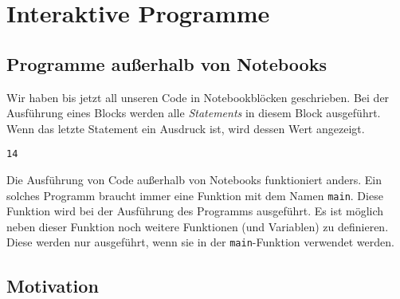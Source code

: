 \label{7531f3b9a5fdae5a}
\section{Interaktive Programme}\label{interaktive-programme}

\subsection{Programme außerhalb von
Notebooks}\label{programme-auuxdferhalb-von-notebooks}

Wir haben bis jetzt all unseren Code in Notebookblöcken geschrieben. Bei
der Ausführung eines Blocks werden alle \emph{Statements} in diesem
Block ausgeführt. Wenn das letzte Statement ein Ausdruck ist, wird
dessen Wert angezeigt.

\label{b9457421e12f0f57}
\begin{Shaded}
\begin{Highlighting}[]
 \OperatorTok{+} 
 \OperatorTok{*} 
\end{Highlighting}
\end{Shaded}

\begin{verbatim}
14
\end{verbatim}

\label{89dbf98ac5d54ed9}
Die Ausführung von Code außerhalb von Notebooks funktioniert anders. Ein
solches Programm braucht immer eine Funktion mit dem Namen
\texttt{main}. Diese Funktion wird bei der Ausführung des Programms
ausgeführt. Es ist möglich neben dieser Funktion noch weitere Funktionen
(und Variablen) zu definieren. Diese werden nur ausgeführt, wenn sie in
der \texttt{main}-Funktion verwendet werden.

\label{184f1507c5a9b3ae}
\begin{Shaded}
\begin{Highlighting}[]
 \OperatorTok{()} \OperatorTok{\{}
\OperatorTok{\}}

\end{Highlighting}
\end{Shaded}

\label{48fc2b62-4bcf-4a55-a7a6-2b6114d122b2}
\subsection{Motivation}\label{motivation}

